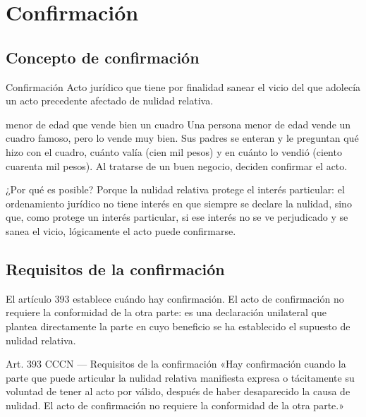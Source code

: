 \documentclass[12pt,oneside]{book}
\begin{document}
\chapter[Confirmación]{Confirmación}
\label{cap:confirmacion}

\section{Concepto de confirmación}

\begin{definition}{Confirmación}
Acto jurídico que tiene por finalidad sanear el vicio del que adolecía un acto precedente afectado de nulidad relativa.
\end{definition}

\begin{example}{menor de edad que vende bien un cuadro}
Una persona menor de edad vende un cuadro famoso, pero lo vende muy bien. Sus padres se enteran y le preguntan qué hizo con el cuadro, cuánto valía (cien mil pesos) y en cuánto lo vendió (ciento cuarenta mil pesos). Al tratarse de un buen negocio, deciden confirmar el acto.
\end{example}

¿Por qué es posible? Porque la nulidad relativa protege el interés particular: el ordenamiento jurídico no tiene interés en que siempre se declare la nulidad, sino que, como protege un interés particular, si ese interés no se ve perjudicado y se sanea el vicio, lógicamente el acto puede confirmarse.

\section{Requisitos de la confirmación}

El artículo 393 establece cuándo hay confirmación. El acto de confirmación no requiere la conformidad de la otra parte: es una declaración unilateral que plantea directamente la parte en cuyo beneficio se ha establecido el supuesto de nulidad relativa.

\begin{articulo}{Art. 393 CCCN --- Requisitos de la confirmación}
«Hay confirmación cuando la parte que puede articular la nulidad relativa manifiesta expresa o tácitamente su voluntad de tener al acto por válido, después de haber desaparecido la causa de nulidad. El acto de confirmación no requiere la conformidad de la otra parte.»
\end{articulo}
\end{document}

